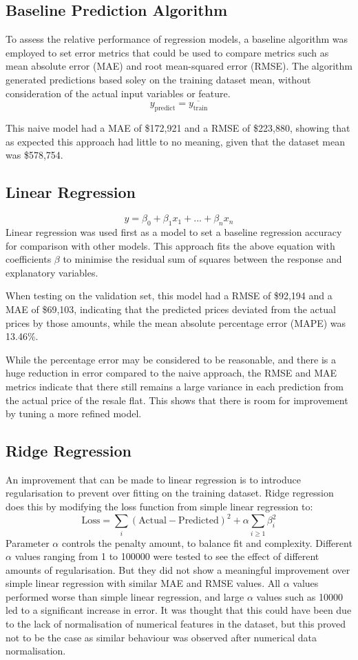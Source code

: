 \documentclass[[12pt,conference]{IEEEtran}
\begin{document}
\subsection{Baseline Prediction Algorithm}
To assess the relative performance of regression models, a baseline algorithm was employed to set error metrics that could be used to compare metrics such as mean absolute error (MAE) and root mean-squared error (RMSE). The algorithm generated predictions based soley on the training dataset mean, without consideration of the actual input variables or feature. 
$$y_{\text{predict}} = \overline{y_\text{train}}$$

This naive model had a MAE of \$172,921 and a RMSE of \$223,880, showing that as expected this approach had little to no meaning, given that the dataset mean was \$578,754.

\subsection{Linear Regression}
$$y = \beta_0 + \beta_1 x_1 + ... + \beta_n x_n$$
Linear regression was used first as a model to set a baseline regression accuracy for comparison with other models. 
This approach fits the above equation with coefficients $\beta$ to minimise the residual sum of squares between the response and explanatory variables.

When testing on the validation set, this model had a RMSE of \$92,194 and a MAE of \$69,103, indicating that the predicted prices deviated from the actual prices by those amounts, while the mean absolute percentage error (MAPE)  was 13.46\%. 

While the percentage error may be considered to be reasonable, and there is a huge reduction in error compared to the naive approach, the RMSE and MAE metrics indicate that there still remains a large variance in each prediction from the actual price of the resale flat.
This shows that there is room for improvement by tuning a more refined model.

\subsection{Ridge Regression}
An improvement that can be made to linear regression is to introduce regularisation to prevent over fitting on the training dataset. 
Ridge regression does this by modifying the loss function from simple linear regression to:
$$\text{Loss} = \sum_i (\text{Actual} - \text{Predicted})^2 + \alpha \sum_{i \geq 1}\beta_i^2$$
Parameter $\alpha$ controls the penalty amount, to balance fit and complexity.
Different $\alpha$ values ranging from 1 to 100000 were tested to see the effect of different amounts of regularisation. But they did not show a meaningful improvement over simple linear regression with similar MAE and RMSE values. All $\alpha$ values performed worse than simple linear regression, and large $\alpha$ values such as 10000 led to a significant increase in error.
It was thought that this could have been due to the lack of normalisation of numerical features in the dataset, but this proved not to be the case as similar behaviour was observed after numerical data normalisation.
\end{document}
